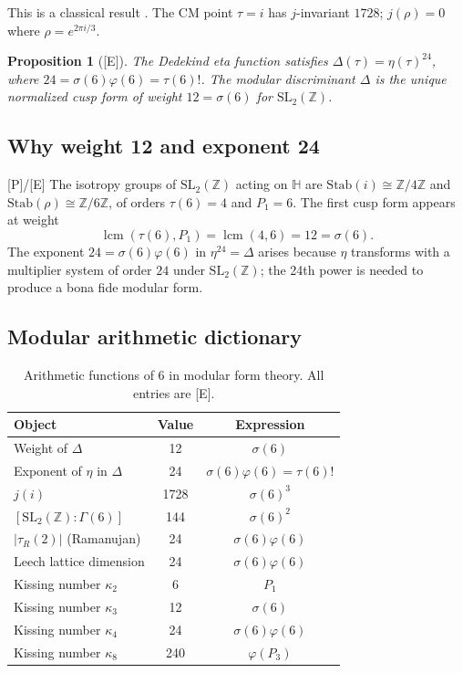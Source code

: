 \documentclass[11pt,letterpaper]{article}
\newtheorem{proposition}[theorem]{Proposition}
\theoremstyle{definition}
\theoremstyle{remark}
\newcommand{\ZZ}{\mathbb{Z}}
\newcommand{\proven}{\textsf{[P]}}
\newcommand{\established}{\textsf{[E]}}
\begin{document}
This is a classical result \cite{Silverman2009}. The CM point $\tau = i$ 
has $j$-invariant $1728$; $j(\rho) = 0$ where $\rho = e^{2\pi i/3}$.

\begin{proposition}[\established]\label{prop:eta}
The Dedekind eta function satisfies $\Delta(\tau) = \eta(\tau)^{24}$, 
where $24 = \sigma(6)\varphi(6) = \tau(6)!$.
The modular discriminant $\Delta$ is the unique normalized cusp form 
of weight $12 = \sigma(6)$ for $\mathrm{SL}_2(\ZZ)$.
\end{proposition}

\subsection{Why weight 12 and exponent 24}

\proven{}/\established{} The isotropy groups of $\mathrm{SL}_2(\ZZ)$ acting on 
$\mathbb{H}$ are $\mathrm{Stab}(i) \cong \ZZ/4\ZZ$ 
and $\mathrm{Stab}(\rho) \cong \ZZ/6\ZZ$, of orders $\tau(6) = 4$ and $P_1 = 6$.
The first cusp form appears at weight
\begin{equation}
\operatorname{lcm}(\tau(6), P_1) = \operatorname{lcm}(4,6) = 12 = \sigma(6).
\end{equation}
The exponent $24 = \sigma(6)\varphi(6)$ in $\eta^{24} = \Delta$ arises because 
$\eta$ transforms with a multiplier system of order $24$ under $\mathrm{SL}_2(\ZZ)$; 
the 24th power is needed to produce a bona fide modular form.

\subsection{Modular arithmetic dictionary}

\begin{table}[ht]
\centering
\caption{Arithmetic functions of $6$ in modular form theory.  
All entries are \established.}
\label{tab:modular}
\begin{tabular}{@{}lcc@{}}
\toprule
Object & Value & Expression \\
\midrule
Weight of $\Delta$ & 12 & $\sigma(6)$ \\
Exponent of $\eta$ in $\Delta$ & 24 & $\sigma(6)\varphi(6) = \tau(6)!$ \\
$j(i)$ & 1728 & $\sigma(6)^3$ \\
$[\mathrm{SL}_2(\ZZ) : \Gamma(6)]$ & 144 & $\sigma(6)^2$ \\
$|\tau_R(2)|$ (Ramanujan) & 24 & $\sigma(6)\varphi(6)$ \\
Leech lattice dimension & 24 & $\sigma(6)\varphi(6)$ \\
Kissing number $\kappa_2$ & 6 & $P_1$ \\
Kissing number $\kappa_3$ & 12 & $\sigma(6)$ \\
Kissing number $\kappa_4$ & 24 & $\sigma(6)\varphi(6)$ \\
Kissing number $\kappa_8$ & 240 & $\varphi(P_3)$ \\
\bottomrule
\end{tabular}
\end{table}
\end{document}
